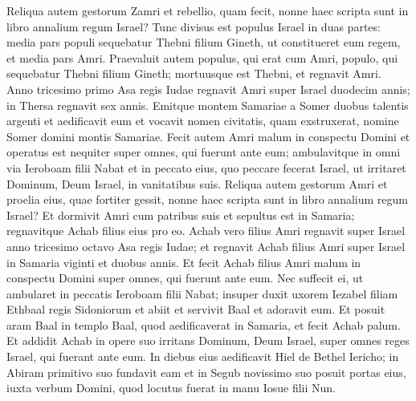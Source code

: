 \begin{biblechapter}
\verse Reliqua autem gestorum Zamri et rebellio, quam fecit, nonne haec scripta sunt in libro annalium regum Israel? 
\verse Tunc divisus est populus Israel in duas partes: media pars populi sequebatur Thebni filium Gineth, ut constitueret eum regem, et media pars Amri. 
\verse Praevaluit autem populus, qui erat cum Amri, populo, qui sequebatur Thebni filium Gineth; mortuusque est Thebni, et regnavit Amri. 
\verse Anno tricesimo primo Asa regis Iudae regnavit Amri super Israel duodecim annis; in Thersa regnavit sex annis. 
\verse Emitque montem Samariae a Somer duobus talentis argenti et aedificavit eum et vocavit nomen civitatis, quam exstruxerat, nomine Somer domini montis Samariae. 
\verse Fecit autem Amri malum in conspectu Domini et operatus est nequiter super omnes, qui fuerunt ante eum;  
\verse ambulavitque in omni via Ieroboam filii Nabat et in peccato eius, quo peccare fecerat Israel, ut irritaret Dominum, Deum Israel, in vanitatibus suis. 
\verse Reliqua autem gestorum Amri et proelia eius, quae fortiter gessit, nonne haec scripta sunt in libro annalium regum Israel? 
\verse Et dormivit Amri cum patribus suis et sepultus est in Samaria; regnavitque Achab filius eius pro eo. 
\verse Achab vero filius Amri regnavit super Israel anno tricesimo octavo Asa regis Iudae; et regnavit Achab filius Amri super Israel in Samaria viginti et duobus annis. 
\verse Et fecit Achab filius Amri malum in conspectu Domini super omnes, qui fuerunt ante eum. 
\verse Nec suffecit ei, ut ambularet in peccatis Ieroboam filii Nabat; insuper duxit uxorem Iezabel filiam Ethbaal regis Sidoniorum et abiit et servivit Baal et adoravit eum. 
\verse Et posuit aram Baal in templo Baal, quod aedificaverat in Samaria, 
\verse et fecit Achab palum. Et addidit Achab in opere suo irritans Dominum, Deum Israel, super omnes reges Israel, qui fuerant ante eum. 
\verse In diebus eius aedificavit Hiel de Bethel Iericho; in Abiram primitivo suo fundavit eam et in Segub novissimo suo posuit portas eius, iuxta verbum Domini, quod locutus fuerat in manu Iosue filii Nun. 
\end{biblechapter}

